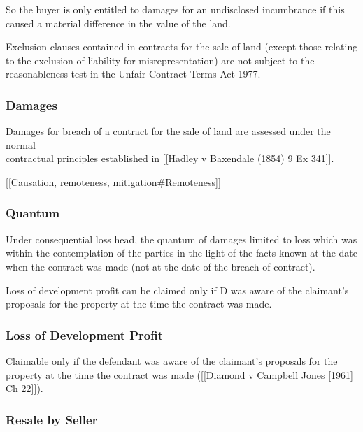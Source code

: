 \documentclass[
]{article}
\newenvironment{Shaded}{}{}
\newcommand{\NormalTok}[1]{#1}
\begin{document}
\begin{Shaded}
\begin{Highlighting}[]
\NormalTok{So the buyer is only entitled to damages for an undisclosed incumbrance if this caused a material difference in the value of the land. }
\end{Highlighting}
\end{Shaded}

Exclusion clauses contained in contracts for the sale of land (except
those relating to the exclusion of liability for misrepresentation) are
not subject to the reasonableness test in the Unfair Contract Terms Act
1977.

\hypertarget{damages}{%
\subsubsection{Damages}\label{damages}}

Damages for breach of a contract for the sale of land are assessed under
the normal\\
contractual principles established in {[}{[}Hadley v Baxendale (1854) 9
Ex 341{]}{]}.

{[}{[}Causation, remoteness, mitigation\#Remoteness{]}{]}

\hypertarget{quantum}{%
\subsubsection{Quantum}\label{quantum}}

Under consequential loss head, the quantum of damages limited to loss
which was within the contemplation of the parties in the light of the
facts known at the date when the contract was made (not at the date of
the breach of contract).

Loss of development profit can be claimed only if D was aware of the
claimant's proposals for the property at the time the contract was made.

\hypertarget{loss-of-development-profit}{%
\subsubsection{Loss of Development
Profit}\label{loss-of-development-profit}}

Claimable only if the defendant was aware of the claimant's proposals
for the property at the time the contract was made ({[}{[}Diamond v
Campbell Jones {[}1961{]} Ch 22{]}{]}).

\hypertarget{resale-by-seller}{%
\subsubsection{Resale by Seller}\label{resale-by-seller}}
\end{document}
